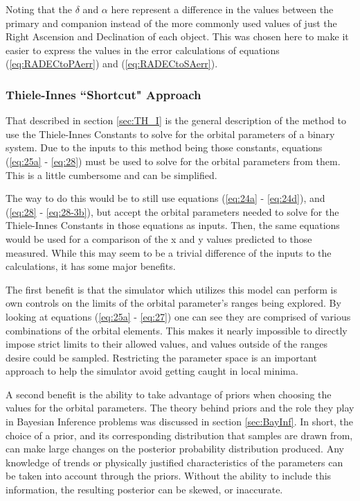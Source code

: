 \documentclass[10pt,preprint]{aastex}
\begin{document}
Noting that the $\delta$ and $\alpha$ here represent a difference in the values between the primary and companion instead of the more commonly used values of just the Right Ascension and Declination of each object.  This was chosen here to make it easier to express the values in the error calculations of equations (\ref{eq:RADECtoPAerr}) and (\ref{eq:RADECtoSAerr}).

\clearpage
\subsubsection{Thiele-Innes ``Shortcut" Approach}\label{sec:TH_I_shortcut}

That described in section \ref{sec:TH_I} is the general description of the method to use the Thiele-Innes Constants to solve for the orbital parameters of a binary system.  Due to the inputs to this method being those constants, equations (\ref{eq:25a} - \ref{eq:28}) must be used to solve for the orbital parameters from them.  This is a little cumbersome and can be simplified.

The way to do this would be to still use equations (\ref{eq:24a} - \ref{eq:24d}), and (\ref{eq:28} - \ref{eq:28-3b}), but accept the orbital parameters needed to solve for the Thiele-Innes Constants in those equations as inputs.  Then, the same equations would be used for a comparison of the x and y values predicted to those measured.  While this may seem to be a trivial difference of the inputs to the calculations, it has some major benefits.

The first benefit is that the simulator which utilizes this model can perform is own controls on the limits of the orbital parameter's ranges being explored.  By looking at equations (\ref{eq:25a} - \ref{eq:27}) one can see they are comprised of various combinations of the orbital elements.  This makes it nearly impossible to directly impose strict limits to their allowed values, and values outside of the ranges desire could be sampled.  Restricting the parameter space is an important approach to help the simulator avoid getting caught in local minima.

A second benefit is the ability to take advantage of priors when choosing the values for the orbital parameters.  The theory behind priors and the role they play in Bayesian Inference problems was discussed in section \ref{sec:BayInf}.  In short, the choice of a prior, and its corresponding distribution that samples are drawn from, can make large changes on the posterior probability distribution produced.  Any knowledge of trends or physically justified characteristics of the parameters can be taken into account through the priors.  Without the ability to include this information, the resulting posterior can be skewed, or inaccurate.
\end{document}
